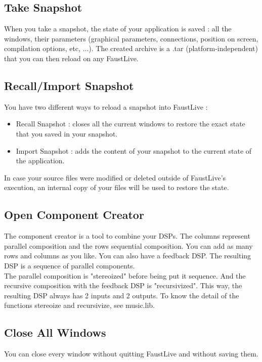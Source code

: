 \documentclass[a4paper]{article}
\begin{document}
\subsection{Take Snapshot}
 When you take a snapshot, the state of your application is saved : all the windows, their parameters (graphical parameters, connections, position on screen, compilation options, etc, ...). The created archive is a .tar (platform-independent) that you can then reload on any FaustLive. 

\subsection{Recall/Import Snapshot}
You have two different ways to reload a snapshot into FaustLive : 
\begin{itemize}
\item Recall Snapshot : closes all the current windows to restore the exact state that you saved in your snapshot.
\item Import Snapshot : adds the content of your snapshot to the current state of the application. 
\end{itemize}

In case your source files were modified or deleted outside of FaustLive's execution, an internal copy of your files will be used to restore the state. 

\subsection{Open Component Creator}
The component creator is a tool to combine your DSPs. The columns represent parallel composition and the rows sequential composition. You can add as many rows and columns as you like. You can also have a feedback DSP. The resulting DSP is a sequence of parallel components. \\

The parallel composition is "stereoized" before being put it sequence. And the recursive composition with the feedback DSP is "recursivized". This way, the resulting DSP always has 2 inputs and 2 outputs. To know the detail of the functions stereoize and recursivize, see music.lib. 


\subsection{Close All Windows}
You can close every window without quitting FaustLive and without saving them.
\end{document}
